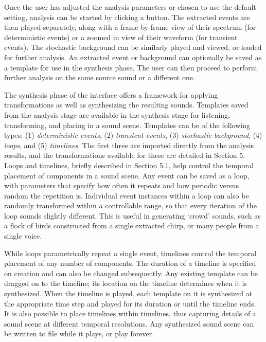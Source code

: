 \documentclass[review]{acmsiggraph}      %
\begin{document}
Once the user has adjusted the analysis parameters or chosen to use the default setting, 
analysis can be started by clicking a button. The extracted events are then played 
separately, along with a frame-by-frame view of their spectrum (for deterministic 
events) or a zoomed in view of their 
waveform (for transient events). The stochastic background can be similarly 
played and viewed, or loaded for further analysis. An 
extracted event or background can optionally be saved as a template for use in 
the synthesis phase. 
The user can then proceed to perform further analysis on the same source sound or 
a different one. 

The synthesis phase of the interface offers a framework for applying 
transformations as well as synthesizing the resulting sounds. Templates 
saved from the analysis stage are available in the synthesis stage for 
listening, transforming, and placing in a sound scene. Templates can be 
of the following types: (1) \emph{deterministic events}, (2) \emph{transient events}, (3) 
\emph{stochastic background}, (4) \emph{loops}, and (5) \emph{timelines}. 
The first three are imported directly from the analysis results, and the 
transformations available for these are detailed in Section 5. Loops 
and timelines, briefly described in Section 5.1, help control the temporal 
placement of components in a 
sound scene. Any event can be saved as a loop, with parameters that 
specify how often it repeats and how periodic versus random the 
repetition is. Individual event instances within a loop can also be 
randomly transformed within a controllable range, so that every 
iteration of the loop sounds slightly different. This is useful in 
generating `crowd' sounds, such as a flock of birds constructed from a 
single extracted chirp, or many people from a single voice. 

While loops parametrically repeat a single event, timelines control the 
temporal placement of any number of components. The duration of a timeline 
is specified on creation and can also be changed subsequently. 
Any existing template can be dragged on to the timeline; its location on the 
timeline determines when it is synthesized. 
When the timeline is played, each template on it is synthesized at the appropriate 
time step and played for its duration or until the timeline ends. 
It is also possible to place 
timelines within timelines, thus capturing details of a sound scene at different 
temporal resolutions. Any synthesized sound scene can be written to file while it 
plays, or play forever.  
\end{document}

